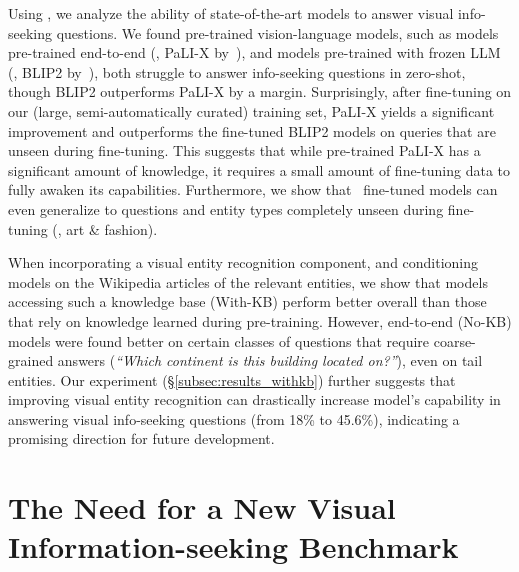 \documentclass[11pt]{article}
\begin{document}
Using \infoseek, we analyze the ability of state-of-the-art models to answer visual info-seeking questions. We found pre-trained vision-language models, such as models pre-trained end-to-end (\eg, PaLI-X by~\citeauthor{chen2023pali}), and models pre-trained with frozen LLM (\eg, BLIP2 by~\citeauthor{li2023blip}), both struggle to answer info-seeking questions in zero-shot, though BLIP2 outperforms PaLI-X by a margin. 
Surprisingly, after fine-tuning on our (large, semi-automatically curated) training set, PaLI-X yields a significant improvement and outperforms the fine-tuned BLIP2 models on queries that are unseen during fine-tuning. This suggests that while pre-trained PaLI-X has a significant amount of knowledge, it requires a small amount of fine-tuning data to fully awaken its capabilities.
Furthermore, we show that \infoseek~fine-tuned models can even generalize to questions and entity types completely unseen during fine-tuning (\eg, art \& fashion).

When incorporating a visual entity recognition component, and conditioning models on the Wikipedia articles of the relevant entities, we show that models accessing such a knowledge base (With-KB) perform better overall than those that rely on knowledge learned during pre-training. However, end-to-end (No-KB) models were found better on certain classes of questions that require coarse-grained answers ({\em ``Which continent is this building located on?''}), even on tail entities. Our experiment (\S \ref{subsec:results_withkb}) further suggests that improving visual entity recognition can drastically increase model's capability in answering visual info-seeking questions (from 18\% to 45.6\%), indicating a promising direction for future development. 
 
\section{The Need for a New Visual Information-seeking Benchmark}
\label{sec:formulation}
\end{document}
